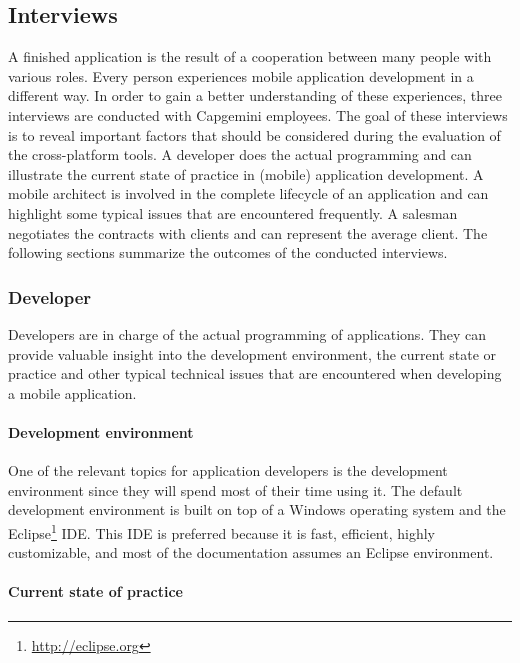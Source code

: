 \subsection{Interviews}
\label{sec:interviews}

A finished application is the result of a cooperation between many people with various roles. Every person experiences mobile application development in a different way. In order to gain a better understanding of these experiences, three interviews are conducted with Capgemini employees. The goal of these interviews is to reveal important factors that should be considered during the evaluation of the cross-platform tools. A developer does the actual programming and can illustrate the current state of practice in (mobile) application development. A mobile architect is involved in the complete lifecycle of an application and can highlight some typical issues that are encountered frequently. A salesman negotiates the contracts with clients and can represent the average client. The following sections summarize the outcomes of the conducted interviews.

\subsubsection{Developer}

Developers are in charge of the actual programming of applications. They can provide valuable insight into the development environment, the current state or practice and other typical technical issues that are encountered when developing a mobile application.

\paragraph{Development environment}

One of the relevant topics for application developers is the development environment since they will spend most of their time using it. The default development environment is built on top of a Windows operating system and the Eclipse\footnote{\url{http://eclipse.org}} IDE. This IDE is preferred because it is fast, efficient, highly customizable, and most of the documentation assumes an Eclipse environment.

\paragraph{Current state of practice}

